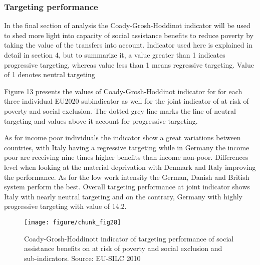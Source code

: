 \documentclass[11pt, a4paper]{article}\usepackage{graphicx, color}
\makeatletter
\def\maxwidth{ %
  \ifdim\Gin@nat@width>\linewidth
    \linewidth
  \else
    \Gin@nat@width
  \fi
}
\newenvironment{knitrout}{}{} %
\makeatother
\begin{document}




\subsubsection*{Targeting performance}

In the final section of analysis the Coady-Grosh-Hoddinot indicator will be used to shed more light into capacity of social assistance benefits to reduce poverty by taking the value of the transfers into account. Indicator used here is explained in detail in section 4, but to summarize it, a value greater than 1 indicates progressive targeting, whereas value less than 1 means regressive targeting. Value of 1 denotes neutral targeting \citep{coady_targeting_2004}

Figure 13 presents the values of Coady-Grosh-Hoddinot indicator for for each three individual EU2020 subindicator as well for the joint indicator of at risk of poverty and social exclusion. The dotted grey line marks the line of neutral targeting and values above it account for progressive targeting.

As for income poor individuals the indicator show a great variations between countries, with Italy having a regressive targeting while in Germany the income poor are receiving nine times higher benefits than income non-poor. Differences level when looking at the material deprivation with Denmark and Italy improving the performance. As for the low work intensity the German, Danish and British system perform the best. Overall targeting performance at joint indicator shows Italy with nearly neutral targeting and on the contrary, Germany with highly progressive targeting with value of 14.2.


\begin{knitrout}
\color{fgcolor}\begin{figure}[H]
\texttt{[image: figure/chunk\_fig28]} \caption[Coady-Grosh-Hoddinott indicator of targeting performance of social assistance benefits on at risk of poverty and social exclusion and sub-indicators]{Coady-Grosh-Hoddinott indicator of targeting performance of social assistance benefits on at risk of poverty and social exclusion and sub-indicators. Source: EU-SILC 2010\label{fig:chunk_fig28}}
\end{figure}

\end{knitrout}
\end{document}
